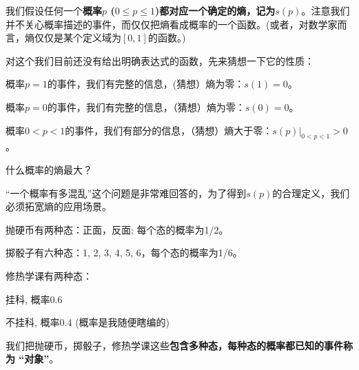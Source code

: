 \documentclass[CJK]{beamer}
\begin{document}
\begin{frame}
\bch
我们假设任何一个{\blue \bf 概率$p$ ($0\le p\le 1$)都对应一个确定的熵，记为$s(p)$}。注意我们并不关心概率描述的事件，而仅仅把熵看成概率的一个函数。(或者，对数学家而言，熵仅仅是某个定义域为$[0,1]$的函数。)

\skipline

对这个我们目前还没有给出明确表达式的函数，先来猜想一下它的性质：

\bitem
\item{概率$p=1$的事件，我们有完整的信息，(猜想）熵为零：$s(1) = 0$。}
\item{概率$p=0$的事件，我们有完整的信息，（猜想）熵为零：$s(0) = 0$。}
\item{概率$0<p<1$的事件，我们有部分的信息，（猜想）熵大于零：$s(p)|_{0<p<1} > 0$。}
\eitem

\ech
\end{frame}


\begin{frame}
\bch
{}
什么概率的熵最大？

\ech
\end{frame}


\begin{frame}
\bch

“一个概率有多混乱”这个问题是非常难回答的，为了得到$s(p)$的合理定义，我们必须拓宽熵的应用场景。

\ech
\end{frame}


\begin{frame}
\bch
\bitem
\item{抛硬币有两种态：正面，反面; 每个态的概率为1/2。

}
\item{掷骰子有六种态：1, 2, 3, 4, 5, 6，每个态的概率为1/6。

}
\item{修热学课有两种态：

挂科, 概率$0.6$ 

不挂科, 概率$0.4$  {\hskip 0.5in} {\small (\bye 概率是我随便瞎编的)}
}
\eitem

我们把抛硬币，掷骰子，修热学课这些{\bf 包含多种态，每种态的概率都已知的事件称为 “对象”}。

\ech
\end{frame}
\end{document}
